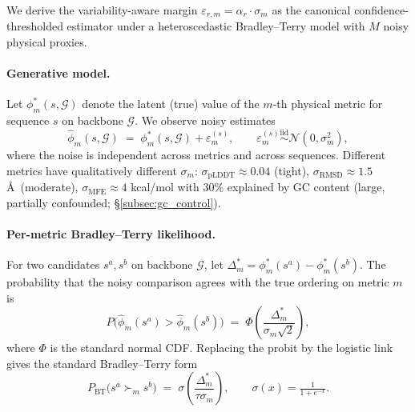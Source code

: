 {{We derive the variability-aware margin $\varepsilon_{r,m} = \alpha_r \cdot \sigma_m$ as the canonical confidence-thresholded estimator under a heteroscedastic Bradley--Terry model with $M$ noisy physical proxies.

\paragraph{Generative model.}
Let $\phi_m^*(s, \mathcal{G})$ denote the latent (true) value of the $m$-th physical metric for sequence $s$ on backbone $\mathcal{G}$. We observe noisy estimates
\begin{equation}
\hat{\phi}_m(s, \mathcal{G}) \;=\; \phi_m^*(s, \mathcal{G}) + \varepsilon_m^{(s)},\qquad \varepsilon_m^{(s)} \overset{\text{iid}}{\sim} \mathcal{N}(0, \sigma_m^2),
\label{eq:noise_model}
\end{equation}
where the noise is independent across metrics and across sequences. Different metrics have qualitatively different $\sigma_m$: $\sigma_{\text{pLDDT}} \approx 0.04$ (tight), $\sigma_{\text{RMSD}} \approx 1.5$ \AA\ (moderate), $\sigma_{\text{MFE}} \approx 4$ kcal/mol with 30\% explained by GC content (large, partially confounded; \S\ref{subsec:gc_control}).

\paragraph{Per-metric Bradley--Terry likelihood.}
For two candidates $s^a, s^b$ on backbone $\mathcal{G}$, let $\Delta_m^* = \phi_m^*(s^a) - \phi_m^*(s^b)$. The probability that the noisy comparison agrees with the true ordering on metric $m$ is
\begin{equation}
P\big(\hat{\phi}_m(s^a) > \hat{\phi}_m(s^b)\big)
\;=\; \Phi\!\left(\frac{\Delta_m^*}{\sigma_m\sqrt{2}}\right),
\label{eq:per_metric_bt}
\end{equation}
where $\Phi$ is the standard normal CDF. Replacing the probit by the logistic link gives the standard Bradley--Terry form
\begin{equation}
P_{\text{BT}}\big(s^a \succ_m s^b\big)
\;=\; \sigma\!\left(\frac{\Delta_m^*}{\tau \sigma_m}\right),
\qquad \sigma(x) = \tfrac{1}{1+e^{-x}}.
\end{equation}

}}
